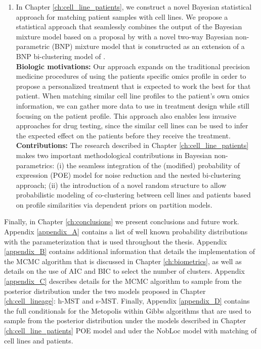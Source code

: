 \begin{enumerate}
\item In Chapter \ref{ch:cell_line_patients}, we construct a novel Bayesian statistical approach for matching patient samples with cell lines. We propose a statistical approach that seamlessly combines the output of the Bayesian mixture model based on a proposal by \cite{poe_2002} with a novel two-way Bayesian non-parametric (BNP) mixture model that is constructed as an extension of a BNP bi-clustering model of \cite{lee2013}.\\
\textbf{Biologic motivations:} Our approach expands on the traditional precision medicine procedures of using the patients specific omics profile in order to propose a personalized treatment that is expected to work the best for that patient. When matching similar cell line profiles to the patient's own omics information, we can gather more data to use in treatment design while still focusing on the patient profile. This approach also enables less invasive approaches for drug testing, since the similar cell lines can be used to infer the expected effect on the patients before they receive the treatment.\\
\textbf{Contributions: } The research described in Chapter \ref{ch:cell_line_patients} makes  two important methodological contributions in Bayesian non-parametrics: (i) the  seamless integration  of the (modified) probability of expression (POE) model for noise reduction  and the nested bi-clustering  approach; (ii) the introduction of a novel random structure to allow probabilistic modeling of co-clustering between cell lines and patients based on profile similarities via dependent priors on partition models.

\end{enumerate}

Finally, in Chapter \ref{ch:conclusions} we present conclusions and future work. Appendix \ref{appendix_A} contains a list of well known probability distributions with the parameterization that is used throughout the thesis. Appendix \ref{appendix_B} contains additional information that details the implementation of the MCMC algorithm that is discussed in Chapter \ref{ch:biometrics}, as well as details on the use of AIC and BIC to select the number of clusters. Appendix \ref{appendix_C} describes details for the MCMC algorithm to sample from the posterior distribution under the two models proposed in Chapter \ref{ch:cell_lineage}: h-MST and s-MST. Finally, Appendix \ref{appendix_D} contains the full conditionals for the Metopolis within Gibbs algorithms that are used to sample from the posterior distribution under the models described in Chapter \ref{ch:cell_line_patients} POE model and uder the NobLoc model with matching of cell lines and patients.


